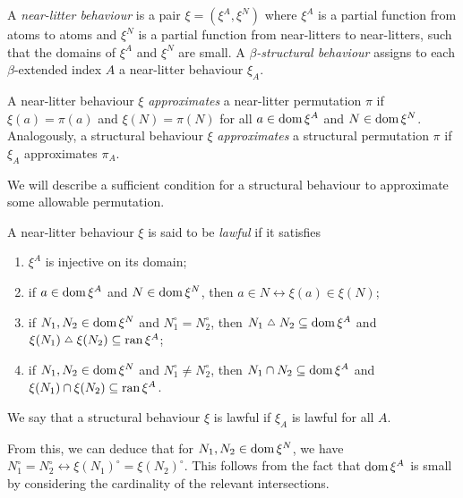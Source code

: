 \begin{definition}
    A \emph{near-litter behaviour} is a pair \( \xi = (\xi^A, \xi^N) \) where \( \xi^A \) is a partial function from atoms to atoms and \( \xi^N \) is a partial function from near-litters to near-litters, such that the domains of \( \xi^A \) and \( \xi^N \) are small.
    A \emph{\( \beta \)-structural behaviour} assigns to each \( \beta \)-extended index \( A \) a near-litter behaviour \( \xi_A \).
\end{definition}

\begin{definition}
    A near-litter behaviour \( \xi \) \emph{approximates} a near-litter permutation \( \pi \) if \( \xi(a) = \pi(a) \) and \( \xi(N) = \pi(N) \) for all \( a \in \operatorname{dom} \xi^A \) and \( N \in \operatorname{dom} \xi^N \).
    Analogously, a structural behaviour \( \xi \) \emph{approximates} a structural permutation \( \pi \) if \( \xi_A \) approximates \( \pi_A \).
\end{definition}

We will describe a sufficient condition for a structural behaviour to approximate some allowable permutation.

\begin{definition}
    \label{def:foa:beh_lawful}
    A near-litter behaviour \( \xi \) is said to be \emph{lawful} if it satisfies
    \begin{enumerate}
        \item \( \xi^A \) is injective on its domain;
        \item if \( a \in \operatorname{dom} \xi^A \) and \( N \in \operatorname{dom} \xi^N \), then \( a \in N \leftrightarrow \xi(a) \in \xi(N) \);
        \item if \( N_1, N_2 \in \operatorname{dom} \xi^N \) and \( N_1^\circ = N_2^\circ \), then \( N_1 \symmdiff N_2 \subseteq \dom \xi^A \) and \( \xi(N_1) \symmdiff \xi(N_2) \subseteq \ran \xi^A \);
        \item if \( N_1, N_2 \in \operatorname{dom} \xi^N \) and \( N_1^\circ \neq N_2^\circ \), then \( N_1 \cap N_2 \subseteq \operatorname{dom} \xi^A \) and \( \xi(N_1) \cap \xi(N_2) \subseteq \operatorname{ran} \xi^A \).
    \end{enumerate}
    We say that a structural behaviour \( \xi \) is lawful if \( \xi_A \) is lawful for all \( A \).
\end{definition}

\begin{remark}
    From this, we can deduce that for \( N_1, N_2 \in \operatorname{dom} \xi^N \), we have \( N_1^\circ = N_2^\circ \leftrightarrow \xi(N_1)^\circ = \xi(N_2)^\circ \).
    This follows from the fact that \( \operatorname{dom} \xi^A \) is small by considering the cardinality of the relevant intersections.
\end{remark}

